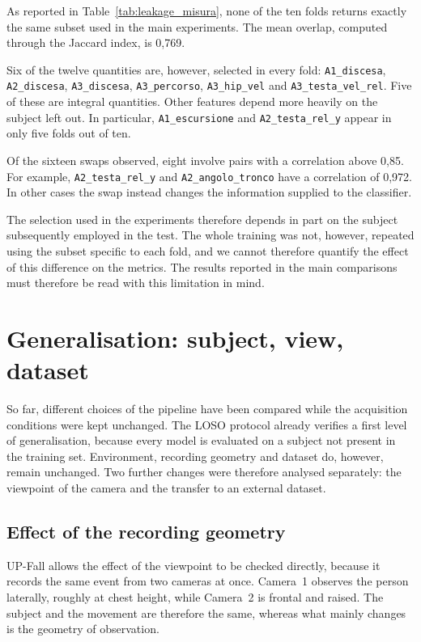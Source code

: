 As reported in Table~\ref{tab:leakage_misura}, none of the ten folds returns exactly the same subset used in the main experiments. The mean overlap, computed through the Jaccard index, is 0,769.

Six of the twelve quantities are, however, selected in every fold: \texttt{A1\_discesa}, \texttt{A2\_discesa}, \texttt{A3\_discesa}, \texttt{A3\_percorso}, \texttt{A3\_hip\_vel} and \texttt{A3\_testa\_vel\_rel}. Five of these are integral quantities. Other features depend more heavily on the subject left out. In particular, \texttt{A1\_escursione} and \texttt{A2\_testa\_rel\_y} appear in only five folds out of ten.

Of the sixteen swaps observed, eight involve pairs with a correlation above 0,85. For example, \texttt{A2\_testa\_rel\_y} and \texttt{A2\_angolo\_tronco} have a correlation of 0,972. In other cases the swap instead changes the information supplied to the classifier.

The selection used in the experiments therefore depends in part on the subject subsequently employed in the test. The whole training was not, however, repeated using the subset specific to each fold, and we cannot therefore quantify the effect of this difference on the metrics. The results reported in the main comparisons must therefore be read with this limitation in mind.

\section{Generalisation: subject, view, dataset}
\label{sec:generalizza}

So far, different choices of the pipeline have been compared while the acquisition conditions were kept unchanged. The LOSO protocol already verifies a first level of generalisation, because every model is evaluated on a subject not present in the training set. Environment, recording geometry and dataset do, however, remain unchanged. Two further changes were therefore analysed separately: the viewpoint of the camera and the transfer to an external dataset.

\subsection{Effect of the recording geometry}
\label{sec:viewpoint}

UP-Fall allows the effect of the viewpoint to be checked directly, because it records the same event from two cameras at once. Camera~1 observes the person laterally, roughly at chest height, while Camera~2 is frontal and raised. The subject and the movement are therefore the same, whereas what mainly changes is the geometry of observation.


